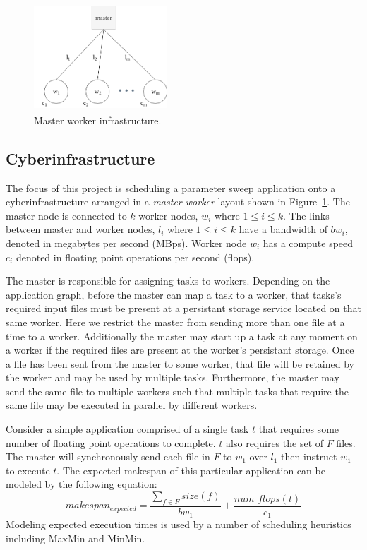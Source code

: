 \begin{figure}[H]
  \centering
  \includegraphics[width=50mm, height=40mm]{figures/platform.png}
  \caption{Master worker infrastructure.}
  \label{fig:platform}
\end{figure}

\subsection*{Cyberinfrastructure}

The focus of this project is scheduling a parameter sweep application onto a
cyberinfrastructure arranged in a \textit{master worker} layout shown in Figure~\ref{fig:platform}. The
master node is connected to $k$ worker nodes, $w_i$ where $1 \leq i \leq k$.
The links between master and worker nodes, $l_i$ where $1 \leq i \leq k$ have
a bandwidth of $bw_i$, denoted in megabytes per second (MBps).
Worker node $w_i$ has a compute speed $c_i$ denoted in floating point operations
per second (flops).

The master is responsible for assigning tasks to workers. Depending
on the application graph, before the master can map a task to a worker,
that tasks's required input files must be present at a persistant storage
service located on that same worker. Here we restrict the master from
sending more than one file at a time to a worker. Additionally the master
may start up a task at any moment on a worker if the required files are present
at the worker's persistant storage. Once a file has been sent from the master
to some worker, that file will be retained by the worker and may be used by
multiple tasks. Furthermore, the master may send the same file to multiple
workers such that multiple tasks that require the same file may be executed
in parallel by different workers.

Consider a simple application comprised of a single task $t$ that requires
some number of floating point operations to complete. $t$ also requires the set
of $F$ files. The master will synchronously send each file in $F$ to $w_1$
over $l_1$ then instruct $w_1$ to execute $t$. The expected makespan of this
particular application can be modeled by the following equation:
$$ makespan_{expected} = \frac{\sum\limits_{f \in F}size(f)}{bw_1} + \frac{num\_flops(t)} {c_1} $$
Modeling expected execution times is used by a number of scheduling heuristics
including MaxMin and MinMin.

